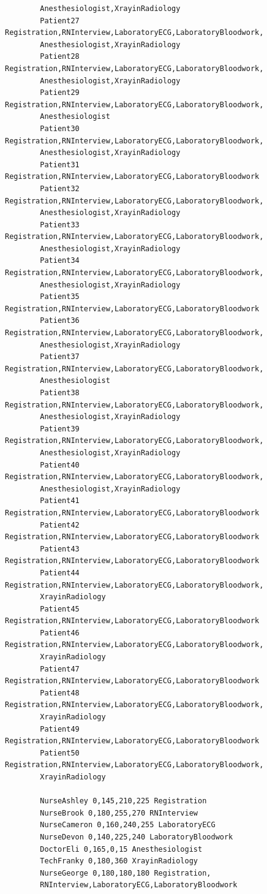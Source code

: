 \documentclass[12pt]{article}
\begin{document}
\begin{verbatim}
		Anesthesiologist,XrayinRadiology
		Patient27 Registration,RNInterview,LaboratoryECG,LaboratoryBloodwork,
		Anesthesiologist,XrayinRadiology
		Patient28 Registration,RNInterview,LaboratoryECG,LaboratoryBloodwork,
		Anesthesiologist,XrayinRadiology
		Patient29 Registration,RNInterview,LaboratoryECG,LaboratoryBloodwork,
		Anesthesiologist
		Patient30 Registration,RNInterview,LaboratoryECG,LaboratoryBloodwork,
		Anesthesiologist,XrayinRadiology
		Patient31 Registration,RNInterview,LaboratoryECG,LaboratoryBloodwork
		Patient32 Registration,RNInterview,LaboratoryECG,LaboratoryBloodwork,
		Anesthesiologist,XrayinRadiology
		Patient33 Registration,RNInterview,LaboratoryECG,LaboratoryBloodwork,
		Anesthesiologist,XrayinRadiology
		Patient34 Registration,RNInterview,LaboratoryECG,LaboratoryBloodwork,
		Anesthesiologist,XrayinRadiology
		Patient35 Registration,RNInterview,LaboratoryECG,LaboratoryBloodwork
		Patient36 Registration,RNInterview,LaboratoryECG,LaboratoryBloodwork,
		Anesthesiologist,XrayinRadiology
		Patient37 Registration,RNInterview,LaboratoryECG,LaboratoryBloodwork,
		Anesthesiologist
		Patient38 Registration,RNInterview,LaboratoryECG,LaboratoryBloodwork,
		Anesthesiologist,XrayinRadiology
		Patient39 Registration,RNInterview,LaboratoryECG,LaboratoryBloodwork,
		Anesthesiologist,XrayinRadiology
		Patient40 Registration,RNInterview,LaboratoryECG,LaboratoryBloodwork,
		Anesthesiologist,XrayinRadiology
		Patient41 Registration,RNInterview,LaboratoryECG,LaboratoryBloodwork
		Patient42 Registration,RNInterview,LaboratoryECG,LaboratoryBloodwork
		Patient43 Registration,RNInterview,LaboratoryECG,LaboratoryBloodwork
		Patient44 Registration,RNInterview,LaboratoryECG,LaboratoryBloodwork,
		XrayinRadiology
		Patient45 Registration,RNInterview,LaboratoryECG,LaboratoryBloodwork
		Patient46 Registration,RNInterview,LaboratoryECG,LaboratoryBloodwork,
		XrayinRadiology
		Patient47 Registration,RNInterview,LaboratoryECG,LaboratoryBloodwork
		Patient48 Registration,RNInterview,LaboratoryECG,LaboratoryBloodwork,
		XrayinRadiology
		Patient49 Registration,RNInterview,LaboratoryECG,LaboratoryBloodwork
		Patient50 Registration,RNInterview,LaboratoryECG,LaboratoryBloodwork,
		XrayinRadiology
		
		NurseAshley 0,145,210,225 Registration
		NurseBrook 0,180,255,270 RNInterview
		NurseCameron 0,160,240,255 LaboratoryECG
		NurseDevon 0,140,225,240 LaboratoryBloodwork
		DoctorEli 0,165,0,15 Anesthesiologist
		TechFranky 0,180,360 XrayinRadiology
		NurseGeorge 0,180,180,180 Registration,
		RNInterview,LaboratoryECG,LaboratoryBloodwork
		\end{verbatim}
\end{document}
